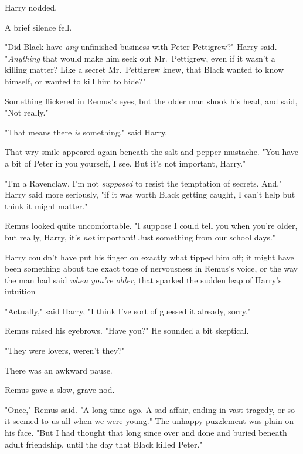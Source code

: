 Harry nodded.

A brief silence fell.

"Did Black have \emph{any} unfinished business with Peter Pettigrew?" Harry
said. "\emph{Anything} that would make him seek out Mr.~Pettigrew, even if it
wasn't a killing matter? Like a secret Mr.~Pettigrew knew, that Black wanted to
know himself, or wanted to kill him to hide?"

Something flickered in Remus's eyes, but the older man shook his head, and
said, "Not really."

"That means there \emph{is} something," said Harry.

That wry smile appeared again beneath the salt-and-pepper mustache. "You have a
bit of Peter in you yourself, I see. But it's not important, Harry."

"I'm a Ravenclaw, I'm not \emph{supposed} to resist the temptation of secrets.
And," Harry said more seriously, "if it was worth Black getting caught, I can't
help but think it might matter."

Remus looked quite uncomfortable. "I suppose I could tell you when you're
older, but really, Harry, it's \emph{not} important! Just something from our
school days."

Harry couldn't have put his finger on exactly what tipped him off; it might
have been something about the exact tone of nervousness in Remus's voice, or
the way the man had said \emph{when you're older}, that sparked the sudden leap
of Harry's intuition{\el}

"Actually," said Harry, "I think I've sort of guessed it already, sorry."

Remus raised his eyebrows. "Have you?" He sounded a bit skeptical.

"They were lovers, weren't they?"

There was an awkward pause.

Remus gave a slow, grave nod.

"Once," Remus said. "A long time ago. A sad affair, ending in vast tragedy, or
so it seemed to us all when we were young." The unhappy puzzlement was plain on
his face. "But I had thought that long since over and done and buried beneath
adult friendship, until the day that Black killed Peter."

